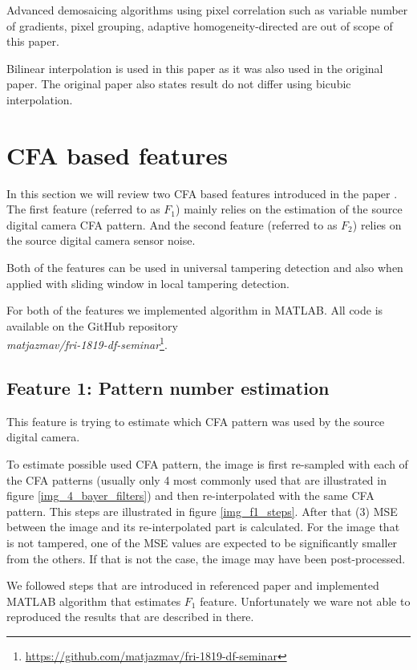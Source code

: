 \documentclass{template/acm_proc_article-sp}
\begin{document}
Advanced demosaicing algorithms using pixel correlation such as 
variable number of gradients, pixel grouping, adaptive homogeneity-directed
are out of scope of this paper.

Bilinear interpolation is used in this paper as it was also used in
the original paper. The original paper also states result do not
differ using bicubic interpolation.


\section{CFA based features}
In this section we will review two CFA based features introduced in the paper \cite{dirik2009image}. The first feature (referred to as  $F_1$) mainly relies on the estimation of the source digital camera CFA pattern. And the second feature (referred to as $F_2$) relies on the source digital camera sensor noise.

Both of the features can be used in universal tampering detection and also when applied with sliding window in local tampering detection.

For both of the features we implemented algorithm in MATLAB. All code is available on the GitHub repository\\\textit{matjazmav/fri-1819-df-seminar}\footnote{\url{https://github.com/matjazmav/fri-1819-df-seminar}}.

\subsection{Feature 1: Pattern number estimation}
This feature is trying to estimate which CFA pattern was used by the source digital camera.

To estimate possible used CFA pattern, the image is first re-sampled with each of the CFA patterns (usually only 4 most commonly used that are illustrated in figure \ref{img_4_bayer_filters}) and then re-interpolated with the same CFA pattern. This steps are illustrated in figure \ref{img_f1_steps}. After that (3) MSE between the image and its re-interpolated part is calculated. For the image that is not tampered, one of the MSE values are expected to be significantly smaller from the others. If that is not the case, the image may have been post-processed.

We followed steps that are introduced in referenced paper \cite{dirik2009image} and implemented MATLAB algorithm that estimates $F_1$ feature. Unfortunately we ware not able to reproduced the results that are described in there.
\end{document}
